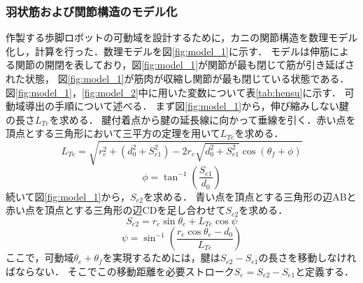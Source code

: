 \subsubsection{羽状筋および関節構造のモデル化}
作製する歩脚ロボットの可動域を設計するために，カニの関節構造を数理モデル化し，計算を行った．数理モデルを図\ref{fig:model_1}に示す．
モデルは伸筋による関節の開閉を表しており，図\ref{fig:model_1}が関節が最も閉じて筋が引き延ばされた状態，
図\ref{fig:model_1}が筋肉が収縮し関節が最も閉じている状態である．
図\ref{fig:model_1}，\ref{fig:model_2}中に用いた変数について表\ref{tab:hensu}に示す．
可動域導出の手順について述べる．
まず図\ref{fig:model_1}から，伸び縮みしない腱の長さ$L_{Te}$を求める．
腱付着点から腱の延長線に向かって垂線を引く．赤い点を頂点とする三角形において三平方の定理を用いて$L_{Te}$を求める．
\begin{equation}
  L_{Te} = \sqrt{r_e^2 + (d_0^2 + S_{e1}^2) - 2r_e\sqrt{d_0^2 + S_{e1}^2}\cos (\theta_f + \phi ) } 
\end{equation}
\begin{equation}
  \phi = \tan^{-1}\left({\dfrac{S_{e1}}{d_0}}\right)
\end{equation}
続いて図\ref{fig:model_1}から，$S_{e2}$を求める．
青い点を頂点とする三角形の辺ABと赤い点を頂点とする三角形の辺CDを足し合わせて$S_{e2}$を求める．
\begin{equation}
  S_{e2} = r_e\sin \theta_e + L_{Te}\cos \psi  
\end{equation}
\begin{equation}
  \psi  = \sin^{-1}\left({\dfrac{r_e \cos \theta_e - d_0}{L_{Te}}}\right)
\end{equation}
ここで，可動域$\theta_e + \theta_f$を実現するためには，腱は$S_{e2} - S_{e1}$の長さを移動しなければならない．
そこでこの移動距離を必要ストローク$S_e = S_{e2} - S_{e1}$と定義する．


